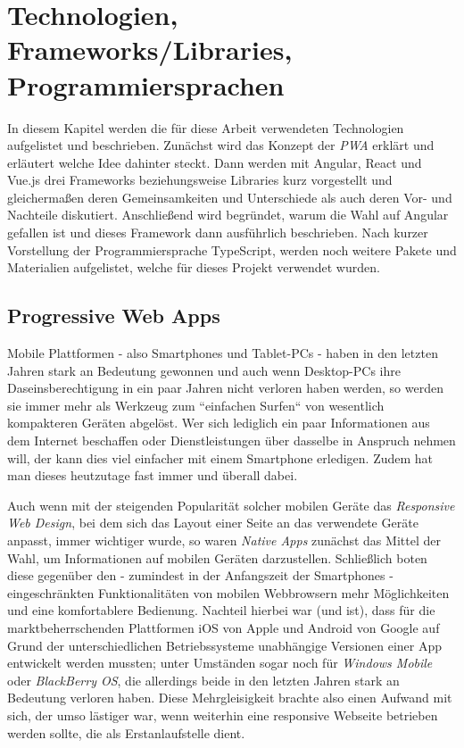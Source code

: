 %
\chapter{Technologien, Frameworks/Libraries, Programmiersprachen}
\label{sec:technologies}


In diesem Kapitel werden die für diese Arbeit verwendeten Technologien aufgelistet und beschrieben.
Zunächst wird das Konzept der \textit{\acl{PWA}} erklärt und erläutert welche Idee dahinter steckt. Dann werden mit Angular, React und Vue.js drei Frameworks beziehungsweise Libraries kurz vorgestellt und gleichermaßen deren Gemeinsamkeiten und Unterschiede als auch deren Vor- und Nachteile diskutiert. Anschließend wird begründet, warum die Wahl auf Angular gefallen ist und dieses Framework dann ausführlich beschrieben. Nach kurzer Vorstellung der Programmiersprache TypeScript, werden noch weitere Pakete und Materialien aufgelistet, welche für dieses Projekt verwendet wurden.

\section{Progressive Web Apps}
\label{sec:technologies:pwa}

Mobile Plattformen - also Smartphones und Tablet-PCs - haben in den letzten Jahren stark an Bedeutung gewonnen und auch wenn Desktop-PCs ihre Daseinsberechtigung in ein paar Jahren nicht verloren haben werden, so werden sie immer mehr als Werkzeug zum ``einfachen Surfen`` von wesentlich kompakteren Geräten abgelöst. Wer sich lediglich ein paar Informationen aus dem Internet beschaffen oder Dienstleistungen über dasselbe in Anspruch nehmen will, der kann dies viel einfacher mit einem Smartphone erledigen. Zudem hat man dieses heutzutage fast immer und überall dabei.

Auch wenn mit der steigenden Popularität solcher mobilen Geräte das \textit{Responsive Web Design}, bei dem sich das Layout einer Seite an das verwendete Geräte anpasst, immer wichtiger wurde, so waren \textit{Native Apps} zunächst das Mittel der Wahl, um Informationen auf mobilen Geräten darzustellen. Schließlich boten diese gegenüber den - zumindest in der Anfangszeit der Smartphones - eingeschränkten Funktionalitäten von mobilen Webbrowsern mehr Möglichkeiten und eine komfortablere Bedienung. Nachteil hierbei war (und ist), dass für die marktbeherrschenden Plattformen iOS von Apple und Android von Google auf Grund der unterschiedlichen Betriebssysteme unabhängige Versionen einer App entwickelt werden mussten; unter Umständen sogar noch für \textit{Windows Mobile} oder \textit{BlackBerry OS}, die allerdings beide in den letzten Jahren stark an Bedeutung verloren haben. Diese Mehrgleisigkeit  brachte also einen Aufwand mit sich, der umso lästiger war, wenn weiterhin eine responsive Webseite betrieben werden sollte, die als Erstanlaufstelle dient.

